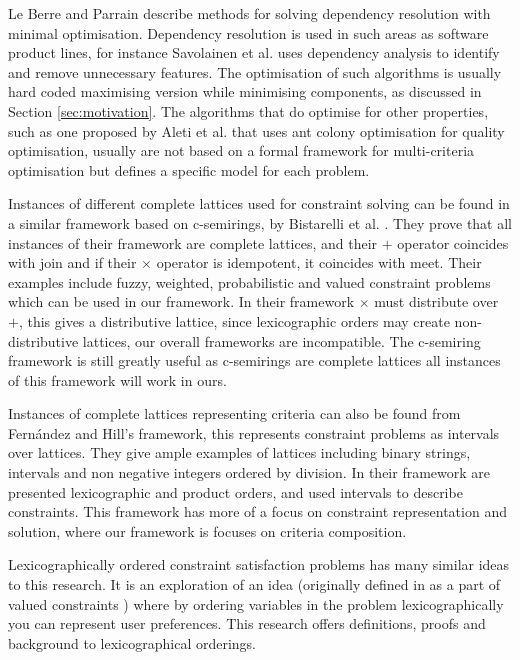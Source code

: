 Le Berre and Parrain \cite{Berre2008} describe methods for solving dependency resolution with minimal optimisation.
Dependency resolution is used in such areas as software product lines,
for instance Savolainen et al. \cite{savolainen_analyzing_2007} uses dependency analysis to identify and remove unnecessary features.
The optimisation of such algorithms is usually hard coded maximising version while minimising components, 
as discussed in Section \ref{sec:motivation}.
The algorithms that do optimise for other properties, 
such as one proposed by Aleti et al. \cite{Aleti2009} that uses ant colony optimisation for quality optimisation,
usually are not based on a formal framework for multi-criteria optimisation but defines a specific model for each problem.

Instances of different complete lattices used for constraint solving can be found in a similar framework based on c-semirings, 
by Bistarelli et al. \cite{Bistarelli1997}.
They prove that all instances of their framework are complete lattices, and their $+$ operator coincides with join
and if their $\times$ operator is idempotent, it coincides with meet.
Their examples include fuzzy, weighted, probabilistic and valued constraint problems which can be used in our framework.
In their framework $\times$ must distribute over $+$, this gives a distributive lattice,
since lexicographic orders may create non-distributive lattices, our overall frameworks are incompatible.
The c-semiring framework is still greatly useful as c-semirings are complete lattices all instances of this framework will work in ours.

Instances of complete lattices representing criteria can also be found from Fern\'{a}ndez and Hill's \cite{Fernandez} framework,
this represents constraint problems as intervals over lattices.
They give ample examples of lattices including binary strings, intervals and non negative integers ordered by division.
In their framework are presented lexicographic and product orders, and used intervals to describe constraints.
This framework has more of a focus on constraint representation and solution, 
where our framework is focuses on criteria composition.

Lexicographically ordered constraint satisfaction problems \cite{Freuder2009} has many similar ideas to this research.
It is an exploration of an idea (originally defined in as a part of valued constraints \cite{schiex1995valued})
where by ordering variables in the problem lexicographically you can represent user preferences.
This research offers definitions, proofs and background to lexicographical orderings.

